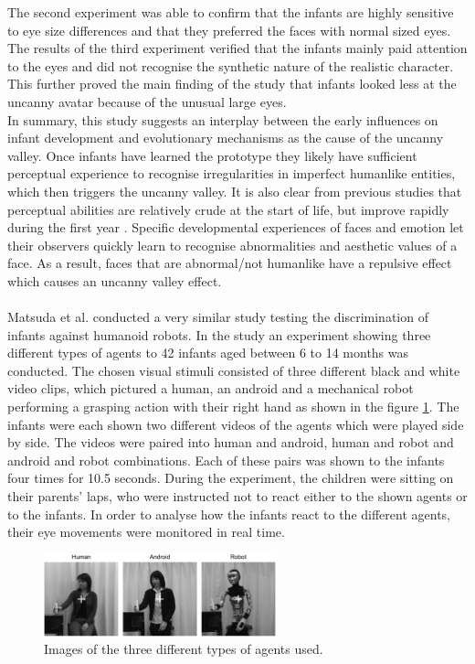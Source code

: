 The second experiment was able to confirm that the infants are highly sensitive to eye size differences and that they preferred the faces with normal sized eyes.\\
The results of the third experiment verified that the infants mainly paid attention to the eyes and did not recognise the synthetic nature of the realistic character. This further proved the main finding of the study that infants looked less at the uncanny avatar because of the unusual large eyes.\\
In summary, this study suggests an interplay between the early influences on infant development and evolutionary mechanisms as the cause of the uncanny valley. Once infants have learned the prototype they likely have sufficient perceptual experience to recognise irregularities in imperfect humanlike entities, which then triggers the uncanny valley. It is also clear from previous studies that perceptual abilities are relatively crude at the start of life, but improve rapidly during the first year \cite{Lewkowicz2009_perceptual_abilities,Pascalis2009_perceptual_abilities}. Specific developmental experiences of faces and emotion let their observers quickly learn to recognise abnormalities and aesthetic values of a face. As a result, faces that are abnormal/not humanlike have a repulsive effect which causes an uncanny valley effect.\\\\
Matsuda et al. \cite{uncanny_infant_discrimination} conducted a very similar study testing the discrimination of infants against humanoid robots. In the study an experiment showing three different types of agents to 42 infants aged between 6 to 14 months was conducted. The chosen visual stimuli consisted of three different black and white video clips, which pictured a human, an android and a mechanical robot performing a grasping action with their right hand as shown in the figure \ref{fig:uncannyInfantsDiscrimination}. The infants were each shown two different videos of the agents which were played side by side. 
\newpage
The videos were paired into human and android, human and robot and android and robot combinations. Each of these pairs was shown to the infants four times for 10.5 seconds. During the experiment, the children were sitting on their parents' laps, who were instructed not to react either to the shown agents or to the infants. In order to analyse how the infants react to the different agents, their eye movements were monitored in real time.
\begin{figure} %
    \centering
    \includegraphics[width=0.6\textwidth]{graphics/uncanny_infants_discrimination.png}
    \caption{Images of the three different types of agents used.}
    \label{fig:uncannyInfantsDiscrimination}
\end{figure}
